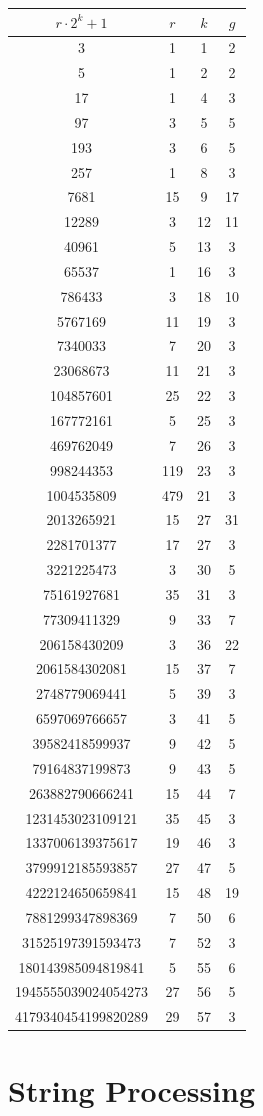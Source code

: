 \documentclass[twoside]{article}
\begin{document}
\begin{enumerate}
    \begin{tabular}{cccc}
        \hline
        $r⋅2^k+1$&$r$&$k$&$g$\\
        \hline
        3&1&1&2\\
        5&1&2&2\\
        17&1&4&3\\
        97&3&5&5\\
        193&3&6&5\\
        257&1&8&3\\
        7681&15&9&17\\
        12289&3&12&11\\
        40961&5&13&3\\
        65537&1&16&3\\
        786433&3&18&10\\
        5767169&11&19&3\\
        7340033&7&20&3\\
        23068673&11&21&3\\
        104857601&25&22&3\\
        167772161&5&25&3\\
        469762049&7&26&3\\
        998244353&119&23&3\\
        1004535809&479&21&3\\
        2013265921&15&27&31\\
        2281701377&17&27&3\\
        3221225473&3&30&5\\
        75161927681&35&31&3\\
        77309411329&9&33&7\\
        206158430209&3&36&22\\
        2061584302081&15&37&7\\
        2748779069441&5&39&3\\
        6597069766657&3&41&5\\
        39582418599937&9&42&5\\
        79164837199873&9&43&5\\
        263882790666241&15&44&7\\
        1231453023109121&35&45&3\\
        1337006139375617&19&46&3\\
        3799912185593857&27&47&5\\
        4222124650659841&15&48&19\\
        7881299347898369&7&50&6\\
        31525197391593473&7&52&3\\
        180143985094819841&5&55&6\\
        1945555039024054273&27&56&5\\
        4179340454199820289&29&57&3\\
        \hline
    \end{tabular}
\end{enumerate}\clearpage\section{String Processing}
\end{document}
